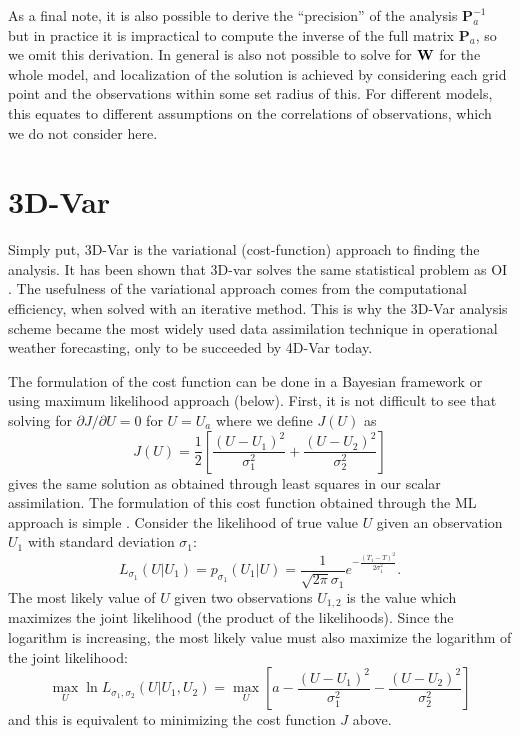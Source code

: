 \documentclass[12pt]{report}
\begin{document}
As a final note, it is also possible to derive the ``precision'' of the analysis $\mathbf{P} _a ^{-1}$ but in practice it is impractical to compute the inverse of the full matrix $\mathbf{P}_a$, so we omit this derivation.
In general is also not possible to solve for $\mathbf{W}$ for the whole model, and localization of the solution is achieved by considering each grid point and the observations within some set radius of this.
For different models, this equates to different assumptions on the correlations of observations, which we do not consider here.

\section{3D-Var}

Simply put, 3D-Var is the variational (cost-function) approach to finding the analysis.
It has been shown that 3D-var solves the same statistical problem as OI .
The usefulness of the variational approach comes from the computational efficiency, when solved with an iterative method.
This is why the 3D-Var analysis scheme became the most widely used data assimilation technique in operational weather forecasting, only to be succeeded by 4D-Var today.

The formulation of the cost function can be done in a Bayesian framework  or using maximum likelihood approach (below).
First, it is not difficult to see that solving for $\partial J/ \partial U = 0$ for $U = U_a$ where we define $J(U)$ as
\begin{equation} J(U) = \frac{1}{2} \left [ \frac{(U-U_1)^2}{\sigma_1^2}+\frac{(U-U_2)^2}{\sigma_2^2} \right ] \end{equation}
gives the same solution as obtained through least squares in our scalar assimilation.
The formulation of this cost function obtained through the ML approach is simple .
Consider the likelihood of true value $U$ given an observation $U_1$ with standard deviation $\sigma_1$:
\begin{equation} L_{\sigma_1}(U|U_1)=p_{\sigma_1}(U_1|U)=\frac{1}{\sqrt{2\pi}\sigma_1}e^{-\frac{(T_1-T)^2}{2\sigma_1^2}} .\end{equation}
The most likely value of $U$ given two observations $U_{1,2}$ is the value which maximizes the joint likelihood (the product of the likelihoods).
Since the logarithm is increasing, the most likely value must also maximize the logarithm of the joint likelihood:
\begin{equation} \max_U \ln L_{\sigma_1,\sigma_2} (U|U_{1},U_{2}) = \max _U \left [ a - \frac{(U-U_1)^2}{\sigma_1^2}-\frac{(U-U_2)^2}{\sigma_2^2} \right ] \end{equation}
and this is equivalent to minimizing the cost function $J$ above.
\end{document}
